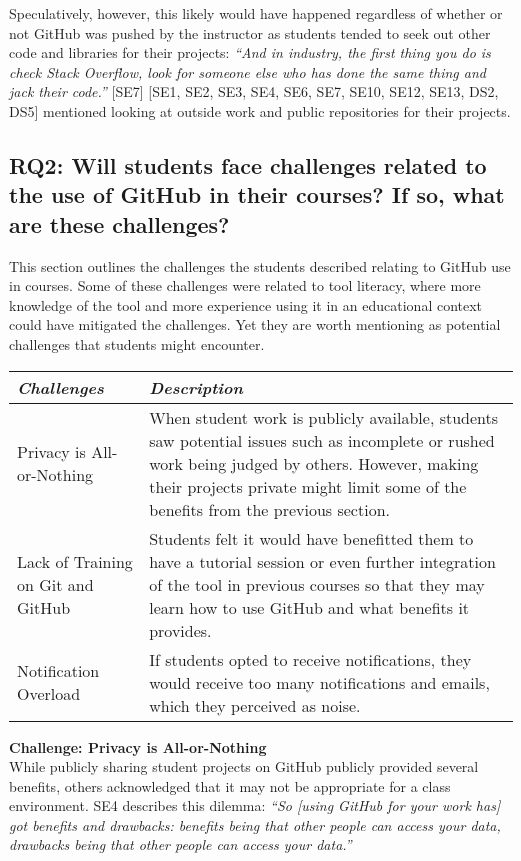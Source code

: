 Speculatively, however, this likely would have happened regardless of whether or not GitHub was pushed by the instructor as students tended to seek out other code and libraries for their projects: \textit{``And in industry, the first thing you do is check Stack Overflow, look for someone else who has done the same thing and jack their code.''} [SE7] [SE1, SE2, SE3, SE4, SE6, SE7, SE10, SE12, SE13, DS2, DS5] mentioned looking at outside work and public repositories for their projects.

\subsection{RQ2: Will students face challenges related to the use of GitHub in their courses? If so, what are these challenges?}
This section outlines the challenges the students described relating to GitHub use in courses. Some of these challenges were related to tool literacy, where more knowledge of the tool and more experience using it in an educational context could have mitigated the challenges. Yet they are worth mentioning as potential challenges that students might encounter. \\

\begin{center}
\begin{tabular}{ | m{2em} | m{5cm} | }
\hline
\emph{Challenges} & \emph{Description} \\
\hline
Privacy is All-or-Nothing & When student work is publicly available, students saw potential issues such as incomplete or rushed work being judged by others. However, making their projects private might limit some of the benefits from the previous section. \\
\hline
Lack of Training on Git and GitHub & Students felt it would have benefitted them to have a tutorial session or even further integration of the tool in previous courses so that they may learn how to use GitHub and what benefits it provides. \\
\hline
Notification Overload & If students opted to receive notifications, they would receive too many notifications and emails, which they perceived as noise. \\
\hline
\end{tabular}
\end{center}

\textbf{Challenge: Privacy is All-or-Nothing} \\
While publicly sharing student projects on GitHub publicly provided several benefits, others acknowledged that it may not be appropriate for a class environment. SE4 describes this dilemma: \textit{``So [using GitHub for your work has] got benefits and drawbacks: benefits being that other people can access your data, drawbacks being that other people can access your data.''}

